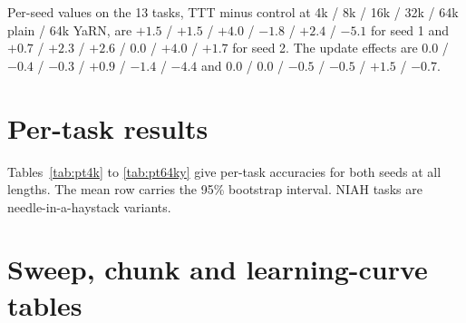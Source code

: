 \documentclass{article}
\begin{document}
Per-seed values on the 13 tasks, TTT minus control at 4k / 8k / 16k / 32k / 64k plain / 64k YaRN, are $+1.5$ / $+1.5$ / $+4.0$ / $-1.8$ / $+2.4$ / $-5.1$ for seed 1 and $+0.7$ / $+2.3$ / $+2.6$ / $0.0$ / $+4.0$ / $+1.7$ for seed 2. The update effects are $0.0$ / $-0.4$ / $-0.3$ / $+0.9$ / $-1.4$ / $-4.4$ and $0.0$ / $0.0$ / $-0.5$ / $-0.5$ / $+1.5$ / $-0.7$.

\section{Per-task results}\label{app:pertask}

Tables~\ref{tab:pt4k} to \ref{tab:pt64ky} give per-task accuracies for both seeds at all lengths. The mean row carries the 95\% bootstrap interval. NIAH tasks are needle-in-a-haystack variants.

\begin{table}[H]\caption{Per-task accuracy at 4k.}\label{tab:pt4k}\centering\resizebox{\textwidth}{!}{}\end{table}
\begin{table}[H]\caption{Per-task accuracy at 8k.}\label{tab:pt8k}\centering\resizebox{\textwidth}{!}{}\end{table}
\begin{table}[H]\caption{Per-task accuracy at 16k.}\label{tab:pt16k}\centering\resizebox{\textwidth}{!}{}\end{table}
\begin{table}[H]\caption{Per-task accuracy at 32k.}\label{tab:pt32k}\centering\resizebox{\textwidth}{!}{}\end{table}
\begin{table}[H]\caption{Per-task accuracy at 64k with plain RoPE.}\label{tab:pt64k}\centering\resizebox{\textwidth}{!}{}\end{table}
\begin{table}[H]\caption{Per-task accuracy at 64k with YaRN $\times 2$.}\label{tab:pt64ky}\centering\resizebox{\textwidth}{!}{}\end{table}

\section{Sweep, chunk and learning-curve tables}\label{app:sweep}
\end{document}
